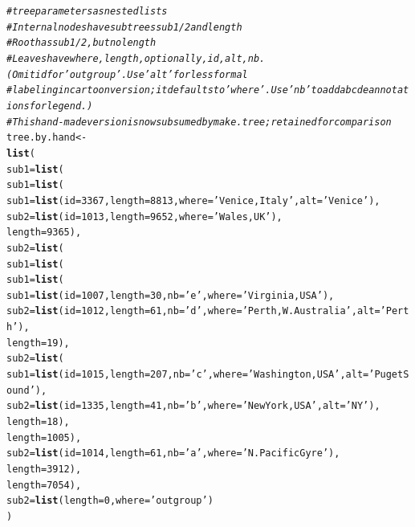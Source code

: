 \documentclass{article}\usepackage[]{graphicx}\usepackage[]{color}
\makeatletter
\newcommand{\hlnum}[1]{\textcolor[rgb]{0.686,0.059,0.569}{#1}}%
\newcommand{\hlstr}[1]{\textcolor[rgb]{0.192,0.494,0.8}{#1}}%
\newcommand{\hlcom}[1]{\textcolor[rgb]{0.678,0.584,0.686}{\textit{#1}}}%
\newcommand{\hlstd}[1]{\textcolor[rgb]{0.345,0.345,0.345}{#1}}%
\newcommand{\hlkwb}[1]{\textcolor[rgb]{0.69,0.353,0.396}{#1}}%
\newcommand{\hlkwc}[1]{\textcolor[rgb]{0.333,0.667,0.333}{#1}}%
\newcommand{\hlkwd}[1]{\textcolor[rgb]{0.737,0.353,0.396}{\textbf{#1}}}%
\newenvironment{kframe}{%
 \def\at@end@of@kframe{}%
 \ifinner\ifhmode%
  \def\at@end@of@kframe{\end{minipage}}%
  \begin{minipage}{\columnwidth}%
 \fi\fi%
 \def\FrameCommand##1{\hskip\@totalleftmargin \hskip-\fboxsep
 \colorbox{shadecolor}{##1}\hskip-\fboxsep
     \hskip-\linewidth \hskip-\@totalleftmargin \hskip\columnwidth}%
 \MakeFramed {\advance\hsize-\width
   \@totalleftmargin\z@ \linewidth\hsize
   \@setminipage}}%
 {\par\unskip\endMakeFramed%
 \at@end@of@kframe}
\newenvironment{knitrout}{}{} %
\makeatother
\begin{document}
\begin{knitrout}\scriptsize
{}\color{fgcolor}\begin{kframe}
\begin{alltt}
\hlcom{# tree parameters as nested lists }
\hlcom{#   Internal nodes have subtrees sub1/2 and length}
\hlcom{#   Root has sub1/2, but no length}
\hlcom{#   Leaves have where, length, optionally, id, alt, nb.  (Omit id for 'outgroup'. Use 'alt' for less formal}
\hlcom{#     labeling in cartoon version; it defaults to 'where'. Use 'nb' to add abcde annotations for legend.)}
\hlcom{# This hand-made version is now subsumed by make.tree; retained for comparison}
\hlstd{tree.by.hand} \hlkwb{<-}
  \hlkwd{list}\hlstd{(}
    \hlkwc{sub1} \hlstd{=} \hlkwd{list}\hlstd{(}
      \hlkwc{sub1} \hlstd{=} \hlkwd{list}\hlstd{(}
        \hlkwc{sub1} \hlstd{=} \hlkwd{list}\hlstd{(}\hlkwc{id}\hlstd{=}\hlnum{3367}\hlstd{,} \hlkwc{length}\hlstd{=}\hlnum{8813}\hlstd{,} \hlkwc{where}\hlstd{=}\hlstr{'Venice, Italy'}\hlstd{,} \hlkwc{alt}\hlstd{=}\hlstr{'Venice'}\hlstd{),}
        \hlkwc{sub2} \hlstd{=} \hlkwd{list}\hlstd{(}\hlkwc{id}\hlstd{=}\hlnum{1013}\hlstd{,} \hlkwc{length}\hlstd{=}\hlnum{9652}\hlstd{,} \hlkwc{where}\hlstd{=}\hlstr{'Wales, UK'}\hlstd{),}
        \hlkwc{length}\hlstd{=}\hlnum{9365}\hlstd{),}
      \hlkwc{sub2} \hlstd{=}  \hlkwd{list}\hlstd{(}
        \hlkwc{sub1} \hlstd{=} \hlkwd{list}\hlstd{(}
          \hlkwc{sub1} \hlstd{=} \hlkwd{list}\hlstd{(}
            \hlkwc{sub1} \hlstd{=} \hlkwd{list}\hlstd{(}\hlkwc{id}\hlstd{=}\hlnum{1007}\hlstd{,} \hlkwc{length}\hlstd{=}\hlnum{30}\hlstd{,} \hlkwc{nb}\hlstd{=}\hlstr{'e'}\hlstd{,} \hlkwc{where}\hlstd{=}\hlstr{'Virginia, USA'}\hlstd{),}
            \hlkwc{sub2} \hlstd{=} \hlkwd{list}\hlstd{(}\hlkwc{id}\hlstd{=}\hlnum{1012}\hlstd{,} \hlkwc{length}\hlstd{=}\hlnum{61}\hlstd{,} \hlkwc{nb}\hlstd{=}\hlstr{'d'}\hlstd{,} \hlkwc{where}\hlstd{=}\hlstr{'Perth, W. Australia'}\hlstd{,} \hlkwc{alt}\hlstd{=}\hlstr{'Perth'}\hlstd{),}
            \hlkwc{length}\hlstd{=}\hlnum{19}\hlstd{),}
          \hlkwc{sub2} \hlstd{=} \hlkwd{list}\hlstd{(}
            \hlkwc{sub1} \hlstd{=} \hlkwd{list}\hlstd{(}\hlkwc{id}\hlstd{=}\hlnum{1015}\hlstd{,} \hlkwc{length}\hlstd{=}\hlnum{207}\hlstd{,}\hlkwc{nb}\hlstd{=}\hlstr{'c'}\hlstd{,} \hlkwc{where}\hlstd{=}\hlstr{'Washington, USA'}\hlstd{,} \hlkwc{alt}\hlstd{=}\hlstr{'Puget Sound'}\hlstd{),}
            \hlkwc{sub2} \hlstd{=} \hlkwd{list}\hlstd{(}\hlkwc{id}\hlstd{=}\hlnum{1335}\hlstd{,} \hlkwc{length}\hlstd{=}\hlnum{41}\hlstd{,} \hlkwc{nb}\hlstd{=}\hlstr{'b'}\hlstd{,} \hlkwc{where}\hlstd{=}\hlstr{'New York, USA'}\hlstd{,}   \hlkwc{alt}\hlstd{=}\hlstr{'NY'}\hlstd{),}
            \hlkwc{length}\hlstd{=}\hlnum{18}\hlstd{),}
          \hlkwc{length}\hlstd{=}\hlnum{1005}\hlstd{),}
        \hlkwc{sub2} \hlstd{=} \hlkwd{list}\hlstd{(}\hlkwc{id}\hlstd{=}\hlnum{1014}\hlstd{,} \hlkwc{length}\hlstd{=}\hlnum{61}\hlstd{,} \hlkwc{nb}\hlstd{=}\hlstr{'a'}\hlstd{,} \hlkwc{where}\hlstd{=}\hlstr{'N. Pacific Gyre'}\hlstd{),}
        \hlkwc{length}\hlstd{=}\hlnum{3912}\hlstd{),}
      \hlkwc{length}\hlstd{=}\hlnum{7054}\hlstd{),}
    \hlkwc{sub2} \hlstd{=} \hlkwd{list}\hlstd{(}\hlkwc{length}\hlstd{=}\hlnum{0}\hlstd{,} \hlkwc{where}\hlstd{=}\hlstr{'outgroup'}\hlstd{)}
  \hlstd{)}


\end{alltt}
\end{kframe}
\end{knitrout}
\end{document}
